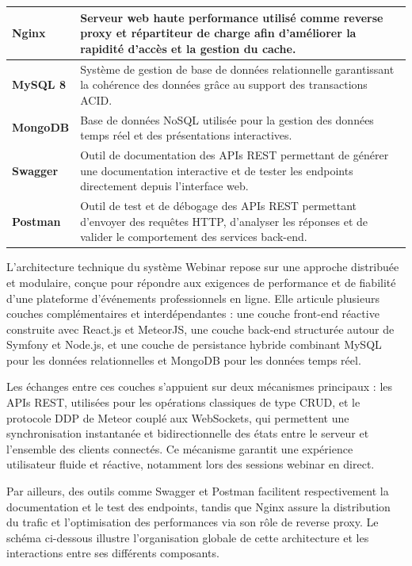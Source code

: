 \begin{longtable}{|p{3.2cm}|p{10.3cm}|}
\textbf{Nginx} & Serveur web haute performance utilisé comme reverse proxy et répartiteur de charge afin d'améliorer la rapidité d'accès et la gestion du cache. \\ \hline
\textbf{MySQL 8} & Système de gestion de base de données relationnelle garantissant la cohérence des données grâce au support des transactions ACID. \\ \hline
\textbf{MongoDB} & Base de données NoSQL utilisée pour la gestion des données temps réel et des présentations interactives. \\ \hline
\textbf{Swagger} & Outil de documentation des APIs REST permettant de générer une documentation interactive et de tester les endpoints directement depuis l'interface web. \\ \hline
\textbf{Postman} & Outil de test et de débogage des APIs REST permettant d'envoyer des requêtes HTTP, d'analyser les réponses et de valider le comportement des services back-end. \\ \hline
\end{longtable}
\normalsize

L'architecture technique du système Webinar repose sur une approche distribuée et modulaire, conçue pour répondre aux exigences de performance et de fiabilité d'une plateforme d'événements professionnels en ligne. Elle articule plusieurs couches complémentaires et interdépendantes : une couche front-end réactive construite avec React.js et MeteorJS, une couche back-end structurée autour de Symfony et Node.js, et une couche de persistance hybride combinant MySQL pour les données relationnelles et MongoDB pour les données temps réel.

Les échanges entre ces couches s'appuient sur deux mécanismes principaux : les APIs REST, utilisées pour les opérations classiques de type CRUD, et le protocole DDP de Meteor couplé aux WebSockets, qui permettent une synchronisation instantanée et bidirectionnelle des états entre le serveur et l'ensemble des clients connectés. Ce mécanisme garantit une expérience utilisateur fluide et réactive, notamment lors des sessions webinar en direct.

Par ailleurs, des outils comme Swagger et Postman facilitent respectivement la documentation et le test des endpoints, tandis que Nginx assure la distribution du trafic et l'optimisation des performances via son rôle de reverse proxy. Le schéma ci-dessous illustre l'organisation globale de cette architecture et les interactions entre ses différents composants.


